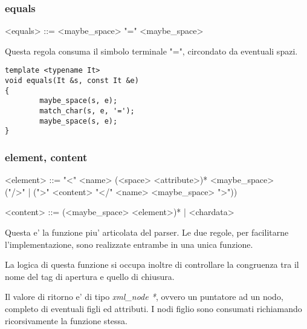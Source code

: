 \documentclass[italian,a4paper]{article}
\begin{document}
\subsubsection{equals}

\begin{grammar}
	<equals> ::= <maybe\_space> "=" <maybe\_space>
\end{grammar}

Questa regola consuma il simbolo terminale "=", circondato da eventuali spazi.

\begin{verbatim}
template <typename It>
void equals(It &s, const It &e)
{
        maybe_space(s, e);
        match_char(s, e, '=');
        maybe_space(s, e);
}
\end{verbatim}

\subsubsection{element, content}

\begin{grammar}
	<element> ::= "<" <name> (<space> <attribute>)* <maybe\_space> \\
	("/>" | (">" <content> "</" <name> <maybe\_space> ">"))

	<content> ::= (<maybe\_space> <element>)* | <chardata>
\end{grammar}

Questa e' la funzione piu' articolata del parser. Le due regole, per facilitarne
l'implementazione, sono realizzate entrambe in una unica funzione.

La logica di questa funzione si occupa inoltre di controllare la congruenza tra
il nome del tag di apertura e quello di chiusura.

Il valore di ritorno e' di tipo \emph{xml_node *}, ovvero un puntatore ad un
nodo, completo di eventuali figli ed attributi. I nodi figlio sono consumati
richiamando ricorsivamente la funzione stessa.
\end{document}
